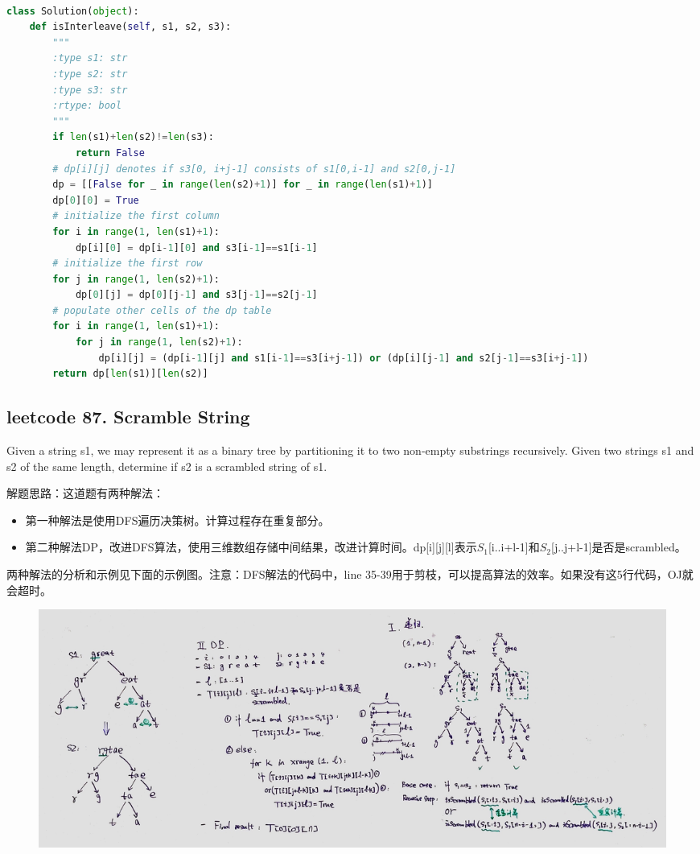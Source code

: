 \documentclass[a4paper,10pt]{article}
\begin{document}
\begin{lstlisting}[language=Python, caption=Problem97. Interleaving String]

class Solution(object):
    def isInterleave(self, s1, s2, s3):
        """
        :type s1: str
        :type s2: str
        :type s3: str
        :rtype: bool
        """
        if len(s1)+len(s2)!=len(s3):
            return False
        # dp[i][j] denotes if s3[0, i+j-1] consists of s1[0,i-1] and s2[0,j-1]
        dp = [[False for _ in range(len(s2)+1)] for _ in range(len(s1)+1)]
        dp[0][0] = True
        # initialize the first column
        for i in range(1, len(s1)+1):
            dp[i][0] = dp[i-1][0] and s3[i-1]==s1[i-1]
        # initialize the first row
        for j in range(1, len(s2)+1):
            dp[0][j] = dp[0][j-1] and s3[j-1]==s2[j-1]
        # populate other cells of the dp table
        for i in range(1, len(s1)+1):
            for j in range(1, len(s2)+1):
                dp[i][j] = (dp[i-1][j] and s1[i-1]==s3[i+j-1]) or (dp[i][j-1] and s2[j-1]==s3[i+j-1])
        return dp[len(s1)][len(s2)]
\end{lstlisting}


\subsection{leetcode 87. Scramble String}
Given a string s1, we may represent it as a binary tree by partitioning it to two non-empty substrings recursively. Given two strings s1 and s2 of the same length, determine if s2 is a scrambled string of s1. \\

\begin{CJK*}{UTF8}{gbsn}
\noindent 解题思路：这道题有两种解法：
\begin{itemize}
    \item 第一种解法是使用DFS遍历决策树。计算过程存在重复部分。
    \item 第二种解法DP，改进DFS算法，使用三维数组存储中间结果，改进计算时间。dp[i][j][l]表示$S_1$[i..i+l-1]和$S_2$[j..j+l-1]是否是scrambled。
\end{itemize}
\noindent 两种解法的分析和示例见下面的示例图。注意：DFS解法的代码中，line 35-39用于剪枝，可以提高算法的效率。如果没有这5行代码，OJ就会超时。
\end{CJK*}

\begin{figure}[h]
\includegraphics[width=\textwidth]{leetcode87.jpg}
\centering \\
\end{figure}
\end{document}
